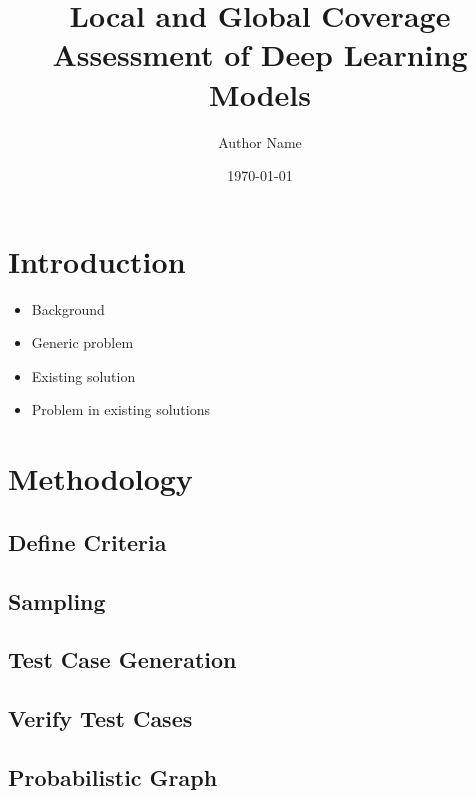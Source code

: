 \documentclass[10pt, conference, a4paper, final]{IEEEtran}
\title{Local and Global Coverage Assessment of Deep Learning Models}
\author{Author Name}
\date{\today}
\begin{document}
\maketitle

\begin{abstract}
\end{abstract}


\section{Introduction}
\begin{itemize}[noitemsep]
    \item Background
    \item Generic problem
    \item Existing solution
    \item Problem in existing solutions
\end{itemize}

\section{Methodology}
\subsection {Define Criteria}
\subsection {Sampling}
\subsection {Test Case Generation}
\subsection {Verify Test Cases}
\subsection {Probabilistic Graph}
\end{document}
